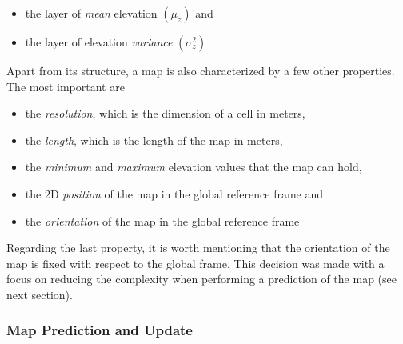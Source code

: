 \begin{itemize}
    \item the layer of \textit{mean} elevation $(\mu_z)$ and
    \item the layer of elevation \textit{variance} $(\sigma^2_z)$
\end{itemize}

Apart from its structure, a map is also characterized by a few other
properties.
The most important are

\begin{itemize}
    \item the \textit{resolution}, which is the dimension of a cell in meters,
    \item the \textit{length}, which is the length of the map in meters,
    \item the \textit{minimum} and \textit{maximum} elevation values that
        the map can hold,
    \item the 2D \textit{position} of the map in the global reference frame and
    \item the \textit{orientation} of the map in the global reference frame
\end{itemize}

Regarding the last property, it is worth mentioning that the orientation
of the map is fixed with respect to the global frame.
This decision was made with a focus on reducing the complexity when performing
a prediction of the map (see next section).

\subsubsection{Map Prediction and Update} \label{map_prediction_and_update}

